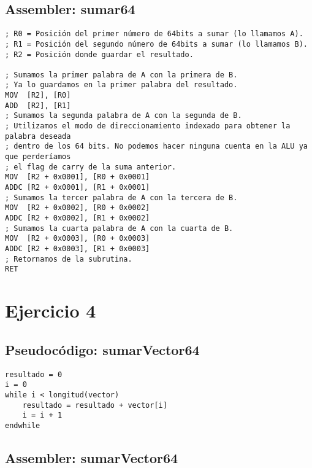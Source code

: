 \subsection{Assembler: sumar64}

\begin{lstlisting}
; R0 = Posición del primer número de 64bits a sumar (lo llamamos A).
; R1 = Posición del segundo número de 64bits a sumar (lo llamamos B).
; R2 = Posición donde guardar el resultado.

; Sumamos la primer palabra de A con la primera de B.
; Ya lo guardamos en la primer palabra del resultado.
MOV  [R2], [R0]
ADD  [R2], [R1]
; Sumamos la segunda palabra de A con la segunda de B.
; Utilizamos el modo de direccionamiento indexado para obtener la palabra deseada
; dentro de los 64 bits. No podemos hacer ninguna cuenta en la ALU ya que perderíamos
; el flag de carry de la suma anterior.
MOV  [R2 + 0x0001], [R0 + 0x0001]
ADDC [R2 + 0x0001], [R1 + 0x0001]
; Sumamos la tercer palabra de A con la tercera de B.
MOV  [R2 + 0x0002], [R0 + 0x0002]
ADDC [R2 + 0x0002], [R1 + 0x0002]
; Sumamos la cuarta palabra de A con la cuarta de B.
MOV  [R2 + 0x0003], [R0 + 0x0003]
ADDC [R2 + 0x0003], [R1 + 0x0003]
; Retornamos de la subrutina.
RET
\end{lstlisting}

\section{Ejercicio 4}

\subsection{Pseudocódigo: sumarVector64}

\begin{lstlisting}
resultado = 0
i = 0
while i < longitud(vector)
    resultado = resultado + vector[i]
    i = i + 1
endwhile
\end{lstlisting}

\subsection{Assembler: sumarVector64}

